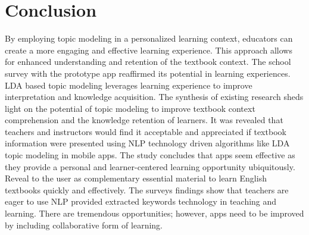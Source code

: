 \documentclass[sn-mathphys,Numbered]{sn-jnl}%
\theoremstyle{thmstyleone}%
\theoremstyle{thmstyletwo}%
\theoremstyle{thmstylethree}%
\begin{document}
\section{Conclusion}\label{conclu}
By employing topic modeling in a personalized learning context, educators can create a more engaging and effective learning experience. This approach allows for enhanced understanding and retention of the textbook context. The school survey with the prototype app reaffirmed its potential in learning experiences. LDA based topic modeling leverages learning experience to improve interpretation and knowledge acquisition. The synthesis of existing research sheds light on the potential of topic modeling to improve textbook context comprehension and the knowledge retention of learners. It was revealed that teachers and instructors would find it acceptable and appreciated if textbook information were presented using NLP technology driven algorithms like LDA topic modeling in mobile apps. The study concludes that apps seem effective as they provide a personal and learner-centered learning opportunity ubiquitously. Reveal to the user as complementary essential material to learn English textbooks quickly and effectively. The survey\textquotesingle s findings show that teachers are eager to use NLP provided extracted keywords technology in teaching and learning. There are tremendous opportunities; however, apps need to be improved by including collaborative form of learning.

 \noindent
%


\end{document}
